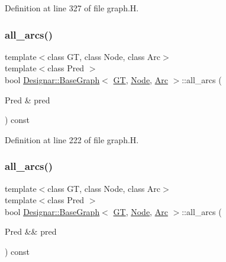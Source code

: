 Definition at line 327 of file graph.\+H.

\mbox{\label{class_designar_1_1_base_graph_a3e2a55dafde6b1edf42f88f4c7d066b8}} 
\subsubsection{\texorpdfstring{all\+\_\+arcs()}{all\_arcs()}\hspace{0.1cm}{\footnotesize\ttfamily [1/2]}}
{\footnotesize\ttfamily template$<$class GT, class Node, class Arc$>$ \\
template$<$class Pred $>$ \\
bool \hyperlink{class_designar_1_1_base_graph}{Designar\+::\+Base\+Graph}$<$ \hyperlink{demo-buildgraph_8_c_a3001c40d2c31ca87ed96cd7d1334a55e}{GT}, \hyperlink{namespace_designar_a5af326c65aa2bd26b26c410f2030d09e}{Node}, \hyperlink{namespace_designar_a3f55fb5513d62ff47cbc8f72b8e95d6f}{Arc} $>$\+::all\+\_\+arcs (\begin{DoxyParamCaption}\item[{Pred \&}]{pred }\end{DoxyParamCaption}) const\hspace{0.3cm}{\ttfamily [inline]}}



Definition at line 222 of file graph.\+H.

\mbox{\label{class_designar_1_1_base_graph_aea71a873faf7e92195d582b21d14c347}} 
\subsubsection{\texorpdfstring{all\+\_\+arcs()}{all\_arcs()}\hspace{0.1cm}{\footnotesize\ttfamily [2/2]}}
{\footnotesize\ttfamily template$<$class GT, class Node, class Arc$>$ \\
template$<$class Pred $>$ \\
bool \hyperlink{class_designar_1_1_base_graph}{Designar\+::\+Base\+Graph}$<$ \hyperlink{demo-buildgraph_8_c_a3001c40d2c31ca87ed96cd7d1334a55e}{GT}, \hyperlink{namespace_designar_a5af326c65aa2bd26b26c410f2030d09e}{Node}, \hyperlink{namespace_designar_a3f55fb5513d62ff47cbc8f72b8e95d6f}{Arc} $>$\+::all\+\_\+arcs (\begin{DoxyParamCaption}\item[{Pred \&\&}]{pred }\end{DoxyParamCaption}) const\hspace{0.3cm}{\ttfamily [inline]}}



